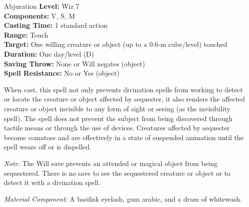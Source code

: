{Abjuration}
{
	\textbf{Level:}
	Wiz 7\\
	\textbf{Components:}
	V, S, M\\
	\textbf{Casting Time:}
	1 standard action\\
	\textbf{Range:}
	Touch\\
	\textbf{Target:}
	One willing creature or object (up to a 0.6-m cube/level) touched\\
	\textbf{Duration:}
	One day/level (D)\\
	\textbf{Saving Throw:}
	None or Will negates (object)\\
	\textbf{Spell Resistance:}
	No or Yes (object)\\
}
{
	When cast, this spell not only prevents divination spells from working to detect or locate the creature or object affected by sequester, it also renders the affected creature or object invisible to any form of sight or seeing (as the invisibility spell). The spell does not prevent the subject from being discovered through tactile means or through the use of devices. Creatures affected by sequester become comatose and are effectively in a state of suspended animation until the spell wears off or is dispelled.

	\textit{Note:} The Will save prevents an attended or magical object from being sequestered. There is no save to see the sequestered creature or object or to detect it with a divination spell.

	\textit{Material Component:}
	A basilisk eyelash, gum arabic, and a dram of whitewash.

}
